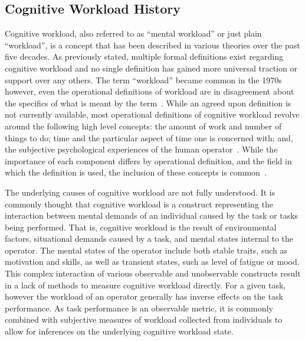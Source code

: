 \documentclass[11pt]{article}
\begin{document}
	\subsection{Cognitive Workload History}
	Cognitive workload, also referred to as ``mental workload'' or just plain ``workload'', is a concept that has been described in various theories over the past  five decades. As previously stated, multiple formal definitions exist regarding cognitive workload and no single definition has gained more universal traction or support over any others. The term ``workload'' became common in the 1970s however, even the operational definitions of workload are in disagreement about the specifics of what is meant by the term~\cite{Huey}. While an agreed upon definition is not currently available, most operational definitions of cognitive workload revolve around the following high level concepts: the amount of work and number of things to do; time and the particular aspect of time one is concerned with; and, the subjective psychological experiences of the human operator~\cite{Lysaght}. While the importance of each component differs by operational definition, and the field in which the definition is used, the inclusion of these concepts is common~\cite{Cain}.
	
	The underlying causes of cognitive workload are not fully understood. It is commonly thought that cognitive workload is a construct representing the interaction between mental demands of an individual caused by the task or tasks being performed. That is, cognitive workload is the result of environmental factors, situational demands caused by a task, and mental states internal to the operator. The mental states of the operator include both stable traits, such as motivation and skills, as well as transient states, such as level of fatigue or mood. This complex interaction of various observable and unobservable constructs result in a lack of methods to measure cognitive workload directly. For a given task, however the workload of an operator generally has inverse effects on the task performance.  As task performance is an observable metric, it is commonly combined with subjective measures of workload collected from individuals to allow for inferences on the underlying cognitive workload state.
		
\end{document}
